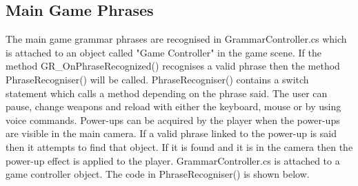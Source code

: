 \documentclass{article}
\begin{document}
\subsection{Main Game Phrases}
The main game grammar phrases are recognised in GrammarController.cs which is attached to an object called "Game Controller" in the game scene. If the method GR\_OnPhraseRecognized() recognises a valid phrase then the method PhraseRecogniser() will be called. PhraseRecogniser() contains a switch statement which calls a method depending on the phrase said. The user can pause, change weapons and reload with either the keyboard, mouse or by using voice commands. Power-ups can be acquired by the player when the power-ups are visible in the main camera. If a valid phrase linked to the power-up is said then it attempts to find that object. If it is found and it is in the camera then the power-up effect is applied to the player. GrammarController.cs is attached to a game controller object. The code in PhraseRecogniser() is shown below.
\end{document}
